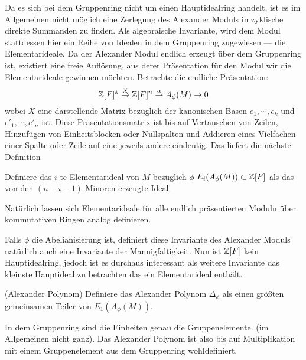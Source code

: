     	Da es sich bei dem Gruppenring nicht um einen Hauptidealring handelt, ist es im Allgemeinen nicht möglich eine Zerlegung des Alexander Moduls in zyklische direkte Summanden zu finden. Als algebraische Invariante, wird dem Modul stattdessen hier ein Reihe von Idealen in dem Gruppenring zugewiesen --- die Elementarideale. Da der Alexander Modul endlich erzeugt über dem Gruppenring ist, existiert eine freie Auflösung, aus derer Präsentation für den Modul wir die Elementarideale gewinnen möchten. Betrachte die endliche Präsentation:
    	\[
    		\mathbb{Z}[F]^k \stackrel{X}{\to} \mathbb{Z}[F]^n \stackrel{\alpha}{\to} A_\phi(M) \to 0
    	\]
    	wobei $X$ eine darstellende Matrix bezüglich der kanonischen Basen $e_1, \cdots , e_k$ und $e'_1, \cdots ,e'_n$ ist. Diese Präsentationsmatrix ist bis auf Vertauschen von Zeilen, Hinzufügen von Einheitsblöcken oder Nullspalten und Addieren eines Vielfachen einer Spalte oder Zeile auf eine jeweils andere eindeutig. Das liefert die nächste Definition
    	\begin{defn}
    		Definiere das $i$-te Elementarideal von $M$ bezüglich $\phi$ $E_i(A_\phi(M)) \subset \mathbb{Z} [F]$ als das von den $(n-i-1)$-Minoren erzeugte Ideal.  
    	\end{defn}

    	Natürlich lassen sich Elementarideale für alle endlich präsentierten Moduln über kommutativen Ringen analog definieren.

    	Falls $\phi$ die Abelianisierung ist, definiert diese Invariante des Alexander Moduls natürlich auch eine Invariante der Mannigfaltigkeit. Nun ist $\mathbb{Z}[F]$ kein Hauptidealring, jedoch ist es durchaus interessant als weitere Invariante das kleinste Hauptideal zu betrachten das ein Elementarideal enthält.
    	\begin{defn}(Alexander Polynom)
    		Definiere das Alexander Polynom $\Delta_\phi$ als einen größten gemeinsamen Teiler von $E_1(A_\phi(M))$.
    	\end{defn}
    	\begin{bem}
    		In dem Gruppenring sind die Einheiten genau die Gruppenelemente. (im Allgemeinen nicht ganz). Das Alexander Polynom ist also bis auf Multiplikation mit einem Gruppenelement aus dem Gruppenring wohldefiniert.
    	\end{bem}

